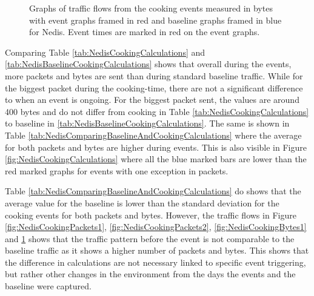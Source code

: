 \begin{figure}[H]
\begin{subfigure}[b]{0.47\textwidth}
    \end{subfigure}
        \begin{subfigure}[b]{0.47\textwidth}
        \centering
    \end{subfigure}
    \begin{subfigure}[b]{0.47\textwidth}
        \centering
    \end{subfigure}
    \begin{subfigure}[b]{0.47\textwidth}
        \centering
    \end{subfigure}
    \hspace{0.6cm}
    \begin{subfigure}[b]{0.47\textwidth}
    \centering
        \end{subfigure}
    \caption{Graphs of traffic flows from the cooking events measured in bytes with event graphs framed in red and baseline graphs framed in blue for Nedis. Event times are marked in red on the event graphs.} 
    \label{fig:NedisCookingBytes2}
\end{figure}

Comparing Table \ref{tab:NedisCookingCalculations} and \ref{tab:NedisBaselineCookingCalculations} shows that overall during the events, more packets and bytes are sent than during standard baseline traffic. While for the biggest packet during the cooking-time, there are not a significant difference to when an event is ongoing. For the biggest packet sent, the values are around 400 bytes and do not differ from cooking in Table \ref{tab:NedisCookingCalculations} to baseline in \ref{tab:NedisBaselineCookingCalculations}. The same is shown in Table \ref{tab:NedisComparingBaselineAndCookingCalculations} where the average for both packets and bytes are higher during events. This is also visible in Figure \ref{fig:NedisCookingCalculations} where all the blue marked bars are lower than the red marked graphs for events with one exception in packets. 

Table \ref{tab:NedisComparingBaselineAndCookingCalculations} do shows that the average value for the baseline is lower than the standard deviation for the cooking events for both packets and bytes. However, the traffic flows in Figure \ref{fig:NedisCookingPackets1}, \ref{fig:NedisCookingPackets2}, \ref{fig:NedisCookingBytes1} and \ref{fig:NedisCookingBytes2} shows that the traffic pattern before the event is not comparable to the baseline traffic as it shows a higher number of packets and bytes. This shows that the difference in calculations are not necessary linked to specific event triggering, but rather other changes in the environment from the days the events and the baseline were captured. 

